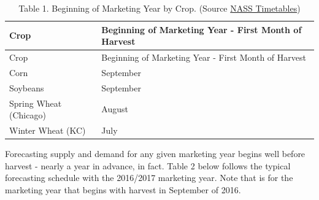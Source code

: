 \documentclass[]{book}
\theoremstyle{definition}
\theoremstyle{definition}
\theoremstyle{remark}
\begin{document}
\begin{longtable}[]{@{}ll@{}}
\caption{Table 1. Beginning of Marketing Year by Crop. (Source
\href{http://www.nass.usda.gov/Publications/National_Crop_Progress/}{NASS
Timetables})}\tabularnewline
\toprule
Crop & Beginning of Marketing Year - First Month of
Harvest\tabularnewline
\midrule
\endfirsthead
\toprule
Crop & Beginning of Marketing Year - First Month of
Harvest\tabularnewline
\midrule
\endhead
Corn & September\tabularnewline
Soybeans & September\tabularnewline
Spring Wheat (Chicago) & August\tabularnewline
Winter Wheat (KC) & July\tabularnewline
\bottomrule
\end{longtable}

Forecasting supply and demand for any given marketing year begins well
before harvest - nearly a year in advance, in fact. Table 2 below
follows the typical forecasting schedule with the 2016/2017 marketing
year. Note that is for the marketing year that begins with harvest in
September of 2016.
\end{document}
